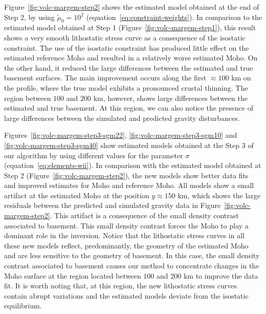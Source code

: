 \documentclass[manuscript]{geophysics}
\begin{document}
Figure~\ref{fig:volc-margem-step2} shows the estimated model obtained at the end
of Step 2, by using $\tilde{\mu}_{0} = 10^{2}$ (equation~\ref{eq:constraint-weights}).
In comparison to the estimated model obtained at Step 1 (Figure~\ref{fig:volc-margem-step1}),
this result shows a very smooth lithostatic stress curve as a consequence of the
isostatic constraint. The use of the isostatic constraint has produced little effect on the
estimated reference Moho and resulted in a relatively worse estimated Moho.
On the other hand, it reduced the large differences between the estimated and 
true basement surfaces. The main improvement occurs along the 
first $\approx 100$ km on the profile, where the true model exhibits a pronounced crustal
thinning. The region between $100$ and $200$ km, however, shows large 
differences between the estimated and true basement. At this region, we can also
notice the presence of large differences between the simulated and predicted gravity
disturbances.

Figures~\ref{fig:volc-margem-step3-sgm22}, \ref{fig:volc-margem-step3-sgm10} and 
\ref{fig:volc-margem-step3-sgm40} show estimated models obtained at
the Step 3 of our algorithm by using different values for the parameter $\sigma$
(equation~\ref{eq:elements-wii}).
In comparison with the estimated model obtained at Step 2 
(Figure~\ref{fig:volc-margem-step2}), the new models 
show better data fits and improved estimates for Moho and reference Moho.
All models show a small artifact at the estimated Moho at the position
$y \approx 150$ km, which shows the large residuals between the predicted
and simulated gravity data in Figure~\ref{fig:volc-margem-step2}. 
This artifact is a consequence of the small density contrast associated 
to basement. This small density contrast forces the Moho to play a dominant role in the inversion.
Notice that the lithostatic stress curves in all these new models reflect, predominantly, 
the geometry of the estimated Moho and are less sensitive to the geometry of basement.
In this case, the small density contrast associated to basement causes our method to concentrate
changes in the Moho surface at the region located between $100$ and $200$ km to improve the data fit.
It is worth noting that, at this region, the new lithostatic stress curves contain abrupt variations
and the estimated models deviate from the isostatic equilibrium.
\end{document}
